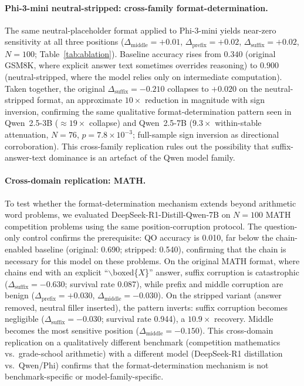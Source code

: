 \documentclass{article}
\theoremstyle{definition}
\theoremstyle{definition}
\newcommand{\MATHORIGbase}{0.690}
\newcommand{\MATHORIGsuffixFW}{0.087}
\newcommand{\MATHSTRIPbase}{0.540}
\newcommand{\MATHSTRIPsuffixFW}{0.944}
\newcommand{\MATHQO}{0.010}
\newcommand{\MATHN}{100}
\begin{document}
\paragraph{Phi-3-mini neutral-stripped: cross-family format-determination.}
The same neutral-placeholder format applied to Phi-3-mini yields near-zero
sensitivity at all three positions
($\Delta_\text{middle}{=}{+}0.01$, $\Delta_\text{prefix}{=}{+}0.02$,
$\Delta_\text{suffix}{=}{+}0.02$, $N{=}100$;
Table~\ref{tab:ablation}).
Baseline accuracy rises from $0.340$ (original GSM8K, where explicit answer
text sometimes overrides reasoning) to $0.900$ (neutral-stripped, where the
model relies only on intermediate computation).
Taken together, the original $\Delta_\text{suffix}{=}{-}0.210$ collapses to
$+0.020$ on the neutral-stripped format, an approximate $10\times$ reduction
in magnitude with sign inversion, confirming the same qualitative
format-determination pattern seen in Qwen~2.5-3B (${\approx}19\times$ collapse)
and Qwen~2.5-7B ($9.3\times$ within-stable attenuation, $N{=}76$,
$p{=}7.8\times10^{-3}$; full-sample sign inversion as directional corroboration).
This cross-family replication rules out the possibility that
suffix-answer-text dominance is an artefact of the Qwen model family.

\paragraph{Cross-domain replication: MATH.}
To test whether the format-determination mechanism extends beyond arithmetic
word problems, we evaluated DeepSeek-R1-Distill-Qwen-7B on $N{=}\MATHN$
MATH competition problems using the same position-corruption protocol.
The question-only control confirms the prerequisite: QO accuracy is \MATHQO,
far below the chain-enabled baseline (original: \MATHORIGbase; stripped:
\MATHSTRIPbase), confirming that the chain is necessary for this model on
these problems.
On the original MATH format, where chains end with an explicit
``$\backslash$boxed\{$X$\}'' answer, suffix corruption is catastrophic
($\Delta_\text{suffix} = -0.630$; survival rate \MATHORIGsuffixFW), while
prefix and middle corruption are benign ($\Delta_\text{prefix} = +0.030$,
$\Delta_\text{middle} = -0.030$). On the stripped variant (answer removed,
neutral filler inserted), the pattern inverts: suffix corruption becomes
negligible ($\Delta_\text{suffix} = -0.030$; survival rate \MATHSTRIPsuffixFW), a $10.9\times$ recovery.
Middle becomes the most sensitive position
($\Delta_\text{middle} = -0.150$). This cross-domain replication on a
qualitatively different benchmark (competition mathematics vs.\ grade-school
arithmetic) with a different model (DeepSeek-R1 distillation vs.\ Qwen/Phi)
confirms that the format-determination mechanism is not benchmark-specific
or model-family-specific.
\end{document}
